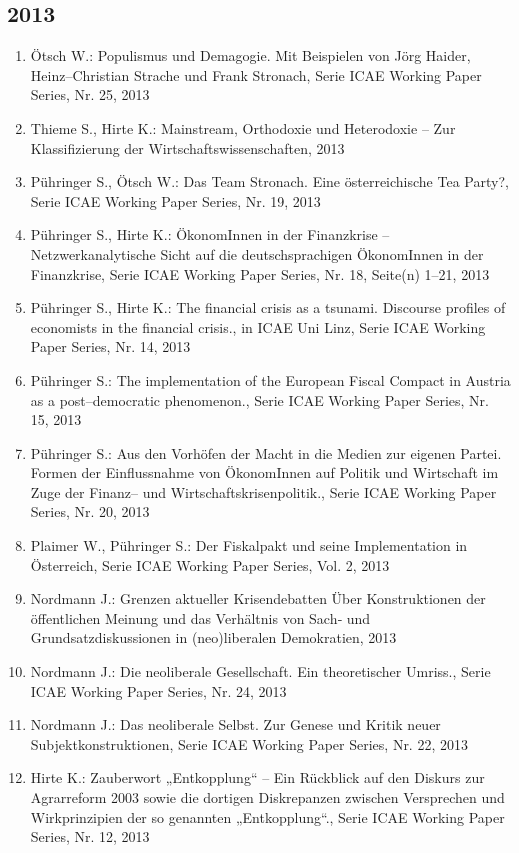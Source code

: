 \subsection*{2013}
\begin{enumerate}
    	 \item Ötsch W.: Populismus und Demagogie. Mit Beispielen von Jörg Haider, Heinz–Christian Strache und Frank Stronach, Serie ICAE Working Paper Series, Nr. 25, 2013
	 \item Thieme S., Hirte K.: Mainstream, Orthodoxie und Heterodoxie – Zur Klassifizierung der Wirtschaftswissenschaften, 2013
	 \item Pühringer S., Ötsch W.: Das Team Stronach. Eine österreichische Tea Party?, Serie ICAE Working Paper Series, Nr. 19, 2013
	 \item Pühringer S., Hirte K.: ÖkonomInnen in der Finanzkrise -- Netzwerkanalytische Sicht auf die deutschsprachigen ÖkonomInnen in der Finanzkrise, Serie ICAE Working Paper Series, Nr. 18, Seite(n) 1--21, 2013
	 \item Pühringer S., Hirte K.: The financial crisis as a tsunami. Discourse profiles of economists in the financial crisis., in ICAE Uni Linz, Serie ICAE Working Paper Series, Nr. 14, 2013
	 \item Pühringer S.: The implementation of the European Fiscal Compact in Austria as a post--democratic phenomenon., Serie ICAE Working Paper Series, Nr. 15, 2013
	 \item Pühringer S.: Aus den Vorhöfen der Macht in die Medien zur eigenen Partei. Formen der Einflussnahme von ÖkonomInnen auf Politik und Wirtschaft im Zuge der Finanz--­ und Wirtschaftskrisenpolitik., Serie ICAE Working Paper Series, Nr. 20, 2013
	 \item Plaimer W., Pühringer S.: Der Fiskalpakt und seine Implementation in Österreich, Serie ICAE Working Paper Series, Vol. 2, 2013
	 \item Nordmann J.: Grenzen aktueller Krisendebatten Über Konstruktionen der öffentlichen Meinung und das Verhältnis von Sach‐ und Grundsatzdiskussionen in (neo)liberalen Demokratien, 2013
	 \item Nordmann J.: Die neoliberale Gesellschaft. Ein theoretischer Umriss., Serie ICAE Working Paper Series, Nr. 24, 2013
	 \item Nordmann J.: Das neoliberale Selbst. Zur Genese und Kritik neuer Subjektkonstruktionen, Serie ICAE Working Paper Series, Nr. 22, 2013
	 \item Hirte K.: Zauberwort „Entkopplung“ – Ein Rückblick auf den Diskurs zur Agrarreform 2003 sowie die dortigen Diskrepanzen zwischen Versprechen und Wirkprinzipien der so genannten „Entkopplung“., Serie ICAE Working Paper Series, Nr. 12, 2013

\end{enumerate}
